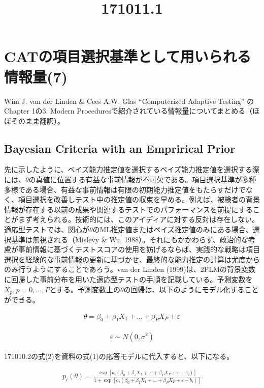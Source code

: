 \documentclass[a4j]{jarticle}
\date{}
\title{171011.1}
\begin{document}
\maketitle

\section{CATの項目選択基準として用いられる情報量(7)}
Wim J. van der Linden \& Cees A.W. Glas ``Computerized Adaptive Testing'' \cite{b1}のChapter 1の3. Modern Proceduresで紹介されている情報量についてまとめる（ほぼそのまま翻訳）。

\subsection{Bayesian Criteria with an Emprirical Prior}
先に示したように、ベイズ能力推定値を選択するベイズ能力推定値を選択する際には、$\theta$の真値に位置する有益な事前情報が不可欠である。項目選択基準が多種多様である場合、有益な事前情報は有限の初期能力推定値をもたらすだけでなく、項目選択を改善しテスト中の推定値の収束を早める。例えば、被検者の背景情報が存在する以前の成果や関連するテストでのパフォーマンスを前提にすることがまず考えられる。技術的には、このアイディアに対する反対は存在しない。適応型テストでは、関心が$\theta$のML推定値またはベイズ推定値のみにある場合、選択基準は無視される（Mislevy \& Wu, 1988）。それにもかかわらず、政治的な考慮が事前情報に基づくテストスコアの使用を妨げるならば、実践的な戦略は項目選択を経験的な事前情報の更新に基づかせ、最終的な能力推定の計算は尤度からのみ行うようにすることであろう。van der Linden (1999)は、2PLMの背景変数に回帰した事前分布を用いた適応型テストの手順を記載している。予測変数を$X_{p},p=0,\ldots,P$とする。予測変数上の$\theta$の回帰は、以下のようにモデル化することができる。

\begin{eqnarray}
  \label{e1}
  \theta=\beta_{0}+\beta_{1}X_{1}+\ldots+\beta_{P}X_{P}+\varepsilon
\end{eqnarray}

\begin{eqnarray}
  \label{e2}
  \varepsilon\sim N(0,\sigma^{2})
\end{eqnarray}

171010.2の式(2)を{資料の式(1)}の応答モデルに代入すると、以下になる。

\begin{eqnarray}
  \label{e3}
  p_{i}(\theta)=\frac{\exp[a_{i}(\beta_{0}+\beta_{1}X_{1}+\ldots+\beta_{P}X_{P}+\varepsilon-b_{i})]}{1+\exp[a_{i}(\beta_{0}+\beta_{1}X_{1}+\ldots+\beta_{P}X_{P}+\varepsilon-b_{i})]}
\end{eqnarray}
\end{document}
